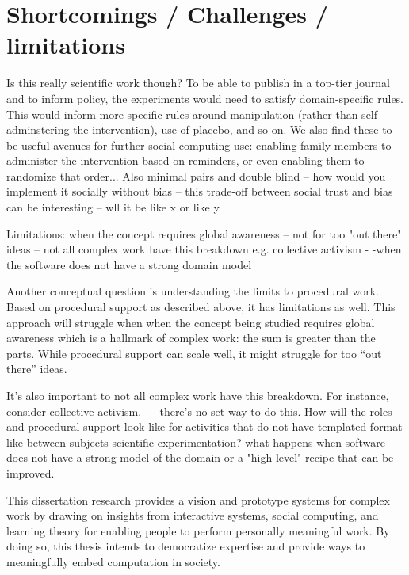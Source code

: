 

\section{Shortcomings / Challenges / limitations}
Is this really scientific work though? To be able to publish in a top-tier journal and to inform policy, the experiments would need to satisfy domain-specific rules. This would inform more specific rules around manipulation (rather than self-adminstering the intervention), use of placebo, and so on. We also find these to be useful avenues for further social computing use: enabling family members to administer the intervention based on reminders, or even enabling them to randomize that order... 
	Also minimal pairs and double blind -- how would you implement it socially without bias -- this trade-off between social trust and bias can be interesting -- wll it be like x or like y

Limitations: when the concept requires global awareness -- not for too "out there" ideas -- not all complex work have this breakdown e.g. collective activism - -when the software does not have a strong domain model

Another conceptual question is understanding the limits to procedural work. Based on procedural support as described above, it has limitations as well. This approach will struggle when when the concept being studied requires global awareness which is a hallmark of complex work: the sum is greater than the parts.  While procedural support can scale well, it might struggle for too “out there” ideas.

It's also important to not all complex work have this breakdown. For instance, consider collective activism. — there’s no set way to do this. How will the roles and procedural support look like for activities that do not have templated format like between-subjects scientific experimentation?  what happens when software does not have a strong model of the domain or a "high-level" recipe that can be improved.




This dissertation research provides a vision and prototype systems for complex work by drawing on insights from interactive systems, social computing, and learning theory  for enabling people to perform personally meaningful work. By doing so, this thesis intends to democratize expertise and provide ways to meaningfully embed computation in society. 
